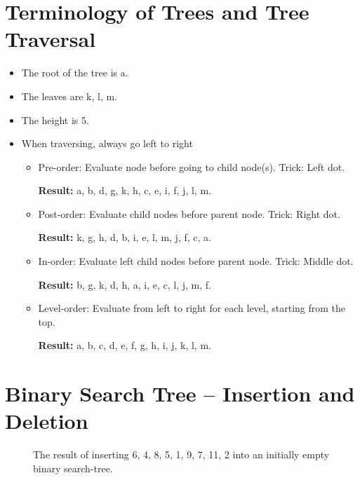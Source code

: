 \documentclass[12pt]{article}
\begin{document}
\section{Terminology of Trees and Tree Traversal}
\label{sec:5}
\begin{itemize}
	\item The root of the tree is a.
	\item The leaves are k, l, m.
	\item The height is 5.
	\item When traversing, always go left to right
	\begin{itemize}
	    \item Pre-order: Evaluate node before going to child node(s). Trick: Left dot.
	    
	    \textbf{Result:} a, b, d, g, k, h, c, e, i, f, j, l, m.
	    
	    \item Post-order: Evaluate child nodes before parent node. Trick: Right dot.
	    
	    \textbf{Result:} k, g, h, d, b, i, e, l, m, j, f, c, a.
	    
	    \item In-order: Evaluate left child nodes before parent node. Trick: Middle dot.
	    
	    \textbf{Result:} b, g, k, d, h, a, i, e, c, l, j, m, f.
	    
	    \item Level-order: Evaluate from left to right for each level,
	    starting from the top. 
	    
	    \textbf{Result:} a, b, c, d, e, f, g, h, i, j, k, l, m.
    \end{itemize}
\end{itemize}
\section{Binary Search Tree – Insertion and Deletion}
\label{sec:6}

\begin{figure}[h]
\caption{The result of inserting 6, 4, 8, 5, 1, 9, 7, 11, 2 
    into an initially empty binary search-tree.}
\label{fig:tree0}
\end{figure}
\end{document}

